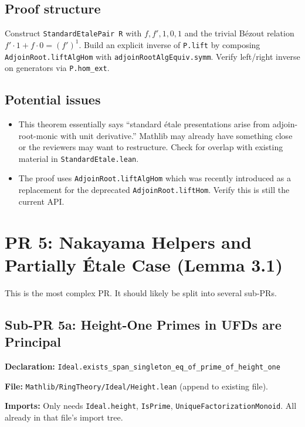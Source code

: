 \subsection*{Proof structure}

Construct \texttt{StandardEtalePair R} with $f, f', 1, 0, 1$ and the
trivial Bézout relation $f' \cdot 1 + f \cdot 0 = (f')^1$.
Build an explicit inverse of \texttt{P.lift} by composing
\texttt{AdjoinRoot.liftAlgHom} with \texttt{adjoinRootAlgEquiv.symm}.
Verify left/right inverse on generators via \texttt{P.hom\_ext}.

\subsection*{Potential issues}
\begin{itemize}
  \item This theorem essentially says ``standard étale presentations arise
    from adjoin-root-monic with unit derivative.'' Mathlib may already have
    something close or the reviewers may want to restructure. Check for
    overlap with existing material in \texttt{StandardEtale.lean}.
  \item The proof uses \texttt{AdjoinRoot.liftAlgHom} which was recently
    introduced as a replacement for the deprecated \texttt{AdjoinRoot.liftHom}.
    Verify this is still the current API.
\end{itemize}


\section{PR 5: Nakayama Helpers and Partially \'Etale Case (Lemma 3.1)}
\label{sec:pr5}

This is the most complex PR. It should likely be split into several sub-PRs.

\subsection*{Sub-PR 5a: Height-One Primes in UFDs are Principal}

\textbf{Declaration:}
\texttt{Ideal.exists\_span\_singleton\_eq\_of\_prime\_of\_height\_one}

\textbf{File:} \texttt{Mathlib/RingTheory/Ideal/Height.lean} (append to existing file).

\textbf{Imports:} Only needs \texttt{Ideal.height}, \texttt{IsPrime},
\texttt{UniqueFactorizationMonoid}. All already in that file's import tree.

